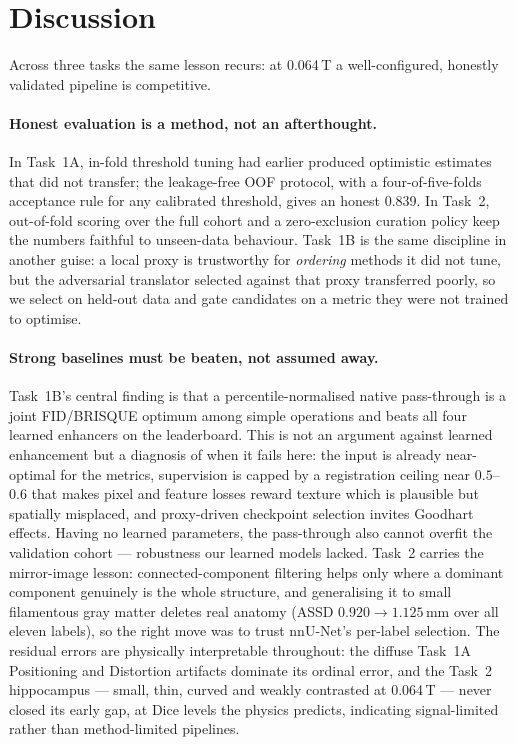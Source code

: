 \documentclass[runningheads]{llncs}
\begin{document}
\FloatBarrier
\section{Discussion}
\label{sec:discussion}

Across three tasks the same lesson recurs: at 0.064\,T a well-configured,
honestly validated pipeline is competitive.

\paragraph{Honest evaluation is a method, not an afterthought.}
In Task~1A, in-fold threshold tuning had earlier produced optimistic estimates
that did not transfer; the leakage-free OOF protocol, with a four-of-five-folds
acceptance rule for any calibrated threshold, gives an honest 0.839. In Task~2,
out-of-fold scoring over the full cohort and a zero-exclusion curation policy keep
the numbers faithful to unseen-data behaviour. Task~1B is the same discipline in
another guise: a local proxy is trustworthy for \emph{ordering} methods it did not
tune, but the adversarial translator selected against that proxy transferred
poorly, so we select on held-out data and gate candidates on a metric they were
not trained to optimise.

\paragraph{Strong baselines must be beaten, not assumed away.}
Task~1B's central finding is that a percentile-normalised native pass-through is a
joint FID/BRISQUE optimum among simple operations and beats all four learned
enhancers on the leaderboard. This is not an argument against learned enhancement
but a diagnosis of when it fails here: the input is already near-optimal for the
metrics, supervision is capped by a registration ceiling near $0.5$--$0.6$ that
makes pixel and feature losses reward texture which is plausible but
spatially misplaced, and proxy-driven checkpoint selection
invites Goodhart effects. Having no learned parameters, the pass-through also
cannot overfit the validation cohort --- robustness our learned models lacked.
Task~2 carries the mirror-image lesson: connected-component filtering helps only
where a dominant component genuinely is the whole structure, and generalising it
to small filamentous gray matter deletes real anatomy (ASSD
$0.920\!\to\!1.125$\,mm over all eleven labels), so the right move was to trust
nnU-Net's per-label selection. The residual errors are physically interpretable throughout: the
diffuse Task~1A Positioning and Distortion artifacts dominate its ordinal error,
and the Task~2 hippocampus --- small, thin, curved and weakly contrasted at
0.064\,T --- never closed its early gap, at Dice levels the physics predicts,
indicating signal-limited rather than method-limited pipelines.
\end{document}
